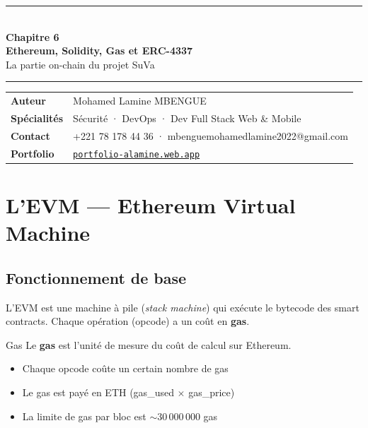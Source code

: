 \documentclass[12pt, a4paper]{article}
\begin{document}
\begin{center}
  {\color{suva_blue}\rule{\linewidth}{2pt}}\\[0.5cm]
  {\Huge\bfseries\color{suva_blue} Chapitre 6}\\[0.3cm]
  {\large\bfseries Ethereum, Solidity, Gas et ERC-4337}\\[0.2cm]
  {\small\color{gray} La partie on-chain du projet SuVa}\\[0.3cm]
  {\color{suva_blue}\rule{\linewidth}{2pt}}
\end{center}

\vspace{0.3cm}
\begin{tcolorbox}[colback=suva_blue!5, colframe=suva_blue!40,
  left=6pt, right=6pt, top=4pt, bottom=4pt]
\small
\begin{tabular}{ll}
  \textbf{Auteur}      & Mohamed Lamine MBENGUE \\
  \textbf{Spécialités} & Sécurité · DevOps · Dev Full Stack Web \& Mobile \\
  \textbf{Contact}     & +221 78 178 44 36 · mbenguemohamedlamine2022@gmail.com \\
  \textbf{Portfolio}   & \href{https://portfolio-alamine.web.app}{\texttt{portfolio-alamine.web.app}} \\
\end{tabular}
\end{tcolorbox}
\vspace{0.3cm}

\tableofcontents
\newpage

\section{L'EVM --- Ethereum Virtual Machine}

\subsection{Fonctionnement de base}

L'EVM est une machine à pile (\emph{stack machine}) qui exécute le bytecode
des smart contracts. Chaque opération (opcode) a un coût en \textbf{gas}.

\begin{defbox}{Gas}
Le \textbf{gas} est l'unité de mesure du coût de calcul sur Ethereum.
\begin{itemize}
  \item Chaque opcode coûte un certain nombre de gas
  \item Le gas est payé en ETH (gas\_used $\times$ gas\_price)
  \item La limite de gas par bloc est $\sim 30\,000\,000$ gas
\end{itemize}
\end{defbox}
\end{document}
